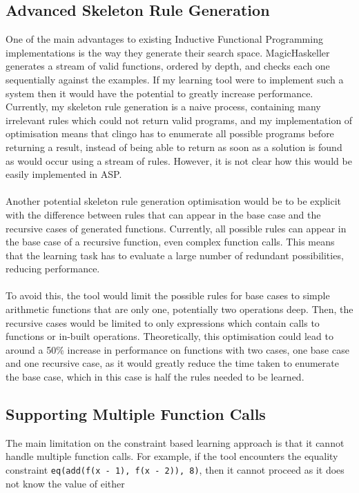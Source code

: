 \subsection{Advanced Skeleton Rule Generation}
One of the main advantages to existing Inductive Functional Programming implementations is the way they generate their search space. MagicHaskeller generates a stream of valid functions, ordered by depth, and checks each one sequentially against the examples. If my learning tool were to implement such a system then it would have the potential to greatly increase performance. Currently, my skeleton rule generation is a naive process, containing many irrelevant rules which could not return valid programs, and my implementation of optimisation means that clingo has to enumerate all possible programs before returning a result, instead of being able to return as soon as a solution is found as would occur using a stream of rules. However, it is not clear how this would be easily implemented in ASP. \\ \\
Another potential skeleton rule generation optimisation would be to be explicit with the difference between rules that can appear in the base case and the recursive cases of generated functions. Currently, all possible rules can appear in the base case of a recursive function, even complex function calls. This means that the learning task has to evaluate a large number of redundant possibilities, reducing performance. \\ \\
To avoid this, the tool would limit the possible rules for base cases to simple arithmetic functions that are only one, potentially two operations deep. Then, the recursive cases would be limited to only expressions which contain calls to functions or in-built operations. Theoretically, this optimisation could lead to around a 50\% increase in performance on functions with two cases, one base case and one recursive case, as it would greatly reduce the time taken to enumerate the base case, which in this case is half the rules needed to be learned.

\subsection{Supporting Multiple Function Calls}
The main limitation on the constraint based learning approach is that it cannot handle multiple function calls. For example, if the tool encounters the equality constraint \lstinline{eq(add(f(x - 1), f(x - 2)), 8)}, then it cannot proceed as it does not know the value of either 

